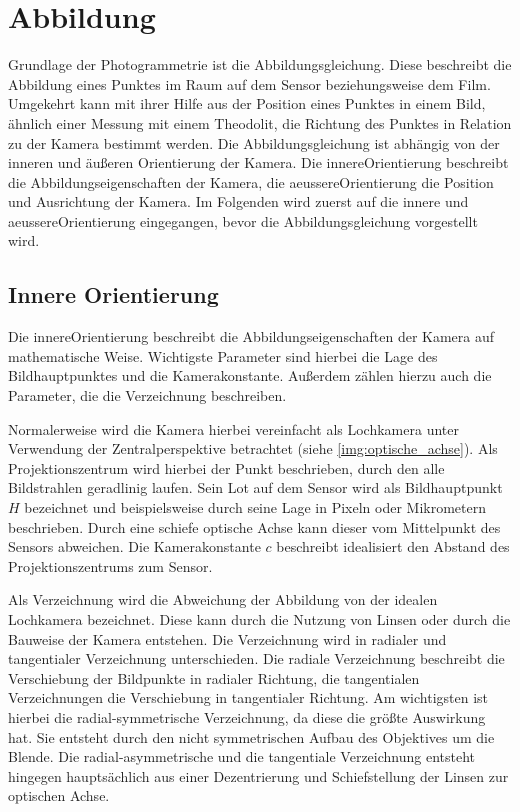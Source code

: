 \documentclass[./00PhotoBox.tex]{subfiles}
\begin{document}
\section{Abbildung}
\label{s:abbildung}
Grundlage der Photogrammetrie ist die Abbildungsgleichung. Diese beschreibt die Abbildung eines Punktes im Raum auf dem Sensor beziehungsweise dem Film. Umgekehrt kann mit ihrer Hilfe aus der Position eines Punktes in einem Bild, ähnlich einer Messung mit einem Theodolit, die Richtung des Punktes in Relation zu der Kamera bestimmt werden. Die Abbildungsgleichung ist abhängig von der inneren und äußeren Orientierung der Kamera. Die \gls{innereOrientierung} beschreibt die Abbildungseigenschaften der Kamera, die \gls{aeussereOrientierung} die Position und Ausrichtung der Kamera. Im Folgenden wird zuerst auf die innere und \gls{aeussereOrientierung} eingegangen, bevor die Abbildungsgleichung vorgestellt wird.

\subsection{Innere Orientierung}
\label{s:innereorientierung}
Die \gls{innereOrientierung} beschreibt die Abbildungseigenschaften der Kamera auf mathematische Weise. Wichtigste Parameter sind hierbei die Lage des \Gls{Bildhauptpunkt}es und die Kamerakonstante. Außerdem zählen hierzu auch die Parameter, die die \Gls{Verzeichnung} beschreiben. \citep[S. 179f]{luhmann}

Normalerweise wird die Kamera hierbei vereinfacht als Lochkamera unter Verwendung der Zentralperspektive betrachtet (siehe \autoref{img:optische_achse}). Als Projektionszentrum wird hierbei der Punkt beschrieben, durch den alle Bildstrahlen geradlinig laufen. Sein Lot auf dem Sensor wird als \Gls{Bildhauptpunkt} $H$ bezeichnet und beispielsweise durch seine Lage in Pixeln oder Mikrometern beschrieben. Durch eine schiefe optische Achse kann dieser vom Mittelpunkt des Sensors abweichen. Die \Gls{Kamerakonstante} $c$ beschreibt idealisiert den Abstand des Projektionszentrums zum Sensor. \citep[S. 177]{luhmann}

Als \Gls{Verzeichnung} wird die Abweichung der Abbildung von der idealen Lochkamera bezeichnet. Diese kann durch die Nutzung von Linsen oder durch die Bauweise der Kamera entstehen. Die \Gls{Verzeichnung} wird in radialer und tangentialer \Gls{Verzeichnung} unterschieden. Die radiale \Gls{Verzeichnung} beschreibt die Verschiebung der Bildpunkte in radialer Richtung, die tangentialen \Gls{Verzeichnung}en die Verschiebung in tangentialer Richtung. Am wichtigsten ist hierbei die radial-symmetrische \Gls{Verzeichnung}, da diese die größte Auswirkung hat. Sie entsteht durch den nicht symmetrischen Aufbau des Objektives um die Blende. Die radial-asymmetrische und die tangentiale \Gls{Verzeichnung} entsteht hingegen hauptsächlich aus einer Dezentrierung und Schiefstellung der Linsen zur optischen Achse. \citep[S. 178]{luhmann}
\end{document}
